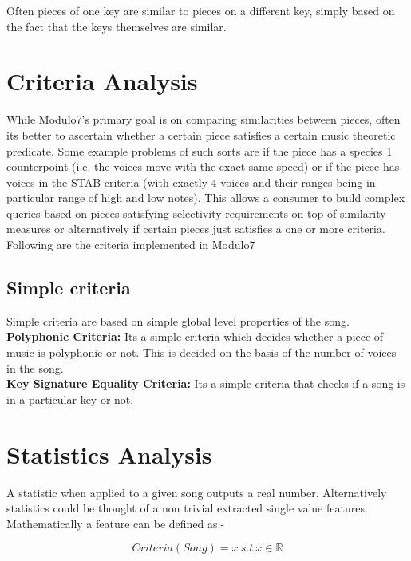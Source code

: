 \noindent Often pieces of one key are similar to pieces on a different key, simply based on the fact that the keys themselves are similar. 


\section{Criteria Analysis} \label{criteria}

\noindent While Modulo7's primary goal is on comparing similarities between pieces, often its better to ascertain whether a certain piece satisfies a certain music theoretic predicate. Some example problems of such sorts are if the piece has a species 1 counterpoint (i.e. the voices move with the exact same speed) or if the piece has voices in the STAB criteria (with exactly 4 voices and their ranges being in particular range of high and low notes). This allows a consumer to build complex queries based on pieces satisfying selectivity requirements on top of similarity measures or alternatively if certain pieces just satisfies a one or more criteria. Following are the criteria implemented in Modulo7

\subsection{Simple criteria} 

\noindent Simple criteria are based on simple global level properties of the song. \\

\noindent \textbf{Polyphonic Criteria:} Its a simple criteria which decides whether a piece of music is polyphonic or not. This is decided on the basis of the number of voices in the song. \\

\noindent \textbf{Key Signature Equality Criteria:} Its a simple criteria that checks if a song is in a particular key or not.

\section{Statistics Analysis} \label{statistic}

\noindent A statistic when applied to a given song outputs a real number. Alternatively statistics could be thought of a non trivial extracted single value features. Mathematically a feature can be defined as:-

\begin{equation}
Criteria(Song) = x \ s.t \ x \in \mathbb{R}
\end{equation}

